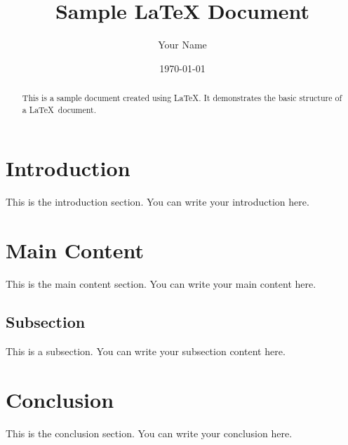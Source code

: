 \documentclass{article}
\title{Sample LaTeX Document}
\author{Your Name}
\date{\today}
\begin{document}
\maketitle

\begin{abstract}
This is a sample document created using \LaTeX. It demonstrates the basic structure of a \LaTeX\ document.
\end{abstract}

\section{Introduction}
This is the introduction section. You can write your introduction here.

\section{Main Content}
This is the main content section. You can write your main content here.

\subsection{Subsection}
This is a subsection. You can write your subsection content here.

\section{Conclusion}
This is the conclusion section. You can write your conclusion here.
\end{document}
